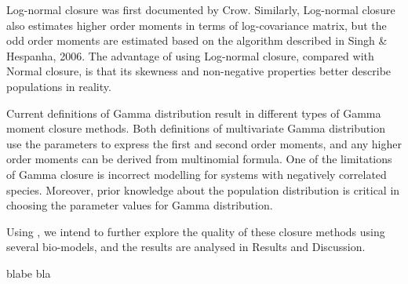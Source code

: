 Log-normal closure was first documented by Crow.  Similarly, Log-normal closure also estimates higher order moments in terms of log-covariance matrix, but the odd order moments are estimated based on the algorithm described in  Singh \& Hespanha, 2006.  The advantage of using Log-normal closure, compared with Normal closure, is that its skewness and non-negative properties better describe populations in reality.

Current definitions of Gamma distribution result in different types of Gamma moment closure methods. Both definitions of multivariate Gamma distribution use the parameters  to express the first and second order moments, and any higher order moments can be derived from multinomial formula.  One of the limitations of Gamma closure is incorrect modelling for systems with negatively correlated species. Moreover, prior knowledge about the population distribution is critical in choosing the parameter values for Gamma distribution. 

Using \means, we intend to further explore the quality of these closure methods using several bio-models, and the results are analysed in Results and Discussion.
 
blabe bla \cite{ale_general_2013}
